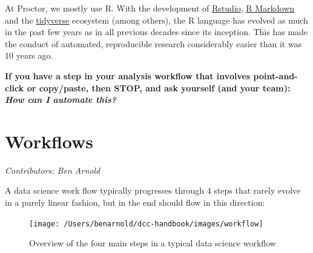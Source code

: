 \documentclass[]{book}
\begin{document}
At Proctor, we mostly use R. With the development of \href{https://rstudio.com/}{Rstudio}, \href{https://rmarkdown.rstudio.com/}{R Markdown} and the \href{https://www.tidyverse.org/}{tidyverse} ecosystem (among others), the R language has evolved as much in the past few years as in all previous decades since its inception. This has made the conduct of automated, reproducible research considerably easier than it was 10 years ago.

\textbf{If you have a step in your analysis workflow that involves point-and-click or copy/paste, then STOP, and ask yourself (and your team): } \textbf{\emph{How can I automate this?}}

\hypertarget{workflows}{%
\chapter{Workflows}\label{workflows}}

\emph{Contributors: Ben Arnold}

A data science work flow typically progresses through 4 steps that rarely evolve in a purely linear fashion, but in the end should flow in this direction:

\begin{figure}
\texttt{[image: /Users/benarnold/dcc-handbook/images/workflow]} \caption{Overview of the four main steps in a typical data science workflow}\label{fig:fig-workflow2}
\end{figure}
\end{document}
